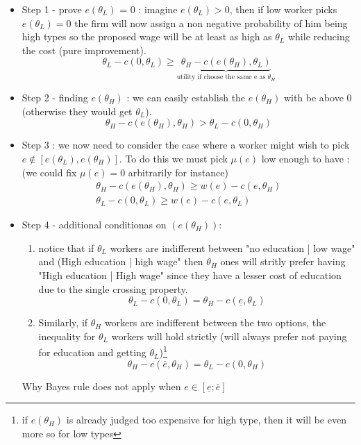 \documentclass{article}
\begin{document}
    \begin{itemize}
        \item Step 1 - prove $e(\theta_L)$ = 0 : imagine $e(\theta_L)>0$, then if low worker picks $e(\theta_L)=0$ the firm will now assign a non negative probability of him being high types so the proposed wage will be at least as high as $\theta_L$ while reducing the cost (pure improvement). 
        \begin{equation}
            \theta_L-c(0,\theta_L) \geq \underbrace{\theta_H-c(e(\theta_H),\theta_L)}_{\text{utility if choose the same e as $\theta_H$}}
        \end{equation}
        \item Step 2 - finding $e(\theta_H)$ : we can easily establish the $e(\theta_H)$ with be above 0 (otherwise they would get $\theta_L$). 
        \begin{equation}
            \theta_H-c(e(\theta_H),\theta_H) > \theta_L-c(0,\theta_H)
        \end{equation}
        \item Step 3 : we now need to consider the case where a worker might wish to pick $e\notin [e(\theta_L),e(\theta_H)]$. To do this we must pick $\mu(e)$ low enough to have : (we could fix $\mu(e)=0$ arbitrarily for instance)
        \begin{equation}
        \begin{aligned}
            \theta_H - c(e(\theta_H),\theta_H) \geq w(e)-c(e,\theta_H)\\
            \theta_L - c(0,\theta_L)\geq w(e)-c(e,\theta_L)
        \end{aligned}
        \end{equation}
        \item Step 4 - additional conditionas on $(e(\theta_H))$: 
        \begin{enumerate}
            \item notice that if $\theta_L$ workers are indifferent between "no education | low wage" and (High education | high wage" then $\theta_H$ ones will stritly prefer having "High education | High wage" since they have a lesser cost of education due to the single crossing property.
            \begin{equation}
                \theta_L-c(0,\theta_L)=\theta_H-c(\underline{e},\theta_L)
            \end{equation}
            \item Similarly, if $\theta_H$ workers are indifferent between the two options, the inequality for $\theta_L$ workers will hold strictly (will always prefer not paying for education and getting $\theta_L$)\footnote{if $e(\theta_H)$ is already judged too expensive for high type, then it will be even more so for low types}
            \begin{equation}
                \theta_H-c(\bar{e},\theta_H)=\theta_L-c(0,\theta_H)
            \end{equation}
        \end{enumerate}
    \begin{simplebox}{Why Bayes rule does not apply when $e\in[\underline{e};\bar{e}]$}
   

\end{simplebox}
\end{itemize}
\end{document}
